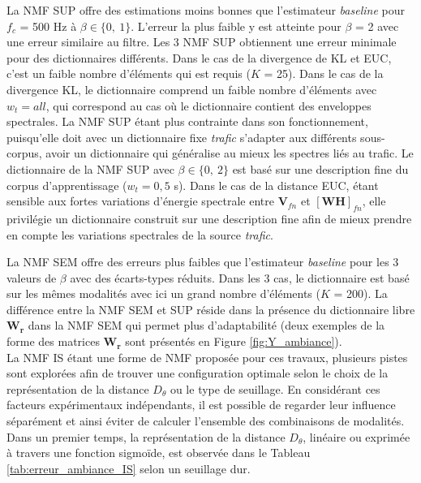La NMF SUP offre des estimations moins bonnes que l'estimateur \textit{baseline} pour $f_c$ = 500 Hz à  $\beta \in \lbrace 0,~1 \rbrace$. L'erreur la plus faible y est atteinte pour $\beta$ = 2 avec une erreur similaire au filtre.
Les 3 NMF SUP obtiennent une erreur minimale pour des dictionnaires différents. Dans le cas de la divergence de KL et EUC, c'est un faible nombre d'éléments qui est requis ($K$ = 25). Dans le cas de la divergence KL, le dictionnaire comprend un faible nombre d'éléments avec $w_t = all$, qui correspond au cas où le dictionnaire contient des enveloppes spectrales. La NMF SUP étant plus contrainte dans son fonctionnement, puisqu'elle doit avec un dictionnaire fixe \textit{trafic} s'adapter aux différents sous-corpus, avoir un dictionnaire qui généralise au mieux les spectres liés au trafic. Le dictionnaire de la NMF SUP avec $\beta \in \lbrace 0,~2 \rbrace$ est basé sur une description fine du corpus d'apprentissage ($w_t = 0,5$ s). Dans le cas de la distance EUC, étant sensible aux fortes variations d'énergie spectrale entre $\mathbf{V}_{fn}$ et $\left[\mathbf{WH}\right]_{fn}$, elle privilégie un dictionnaire construit sur une description fine afin de mieux prendre en compte les variations spectrales de la source \textit{trafic}.

La NMF SEM offre des erreurs plus faibles que l'estimateur \textit{baseline} pour les 3 valeurs de $\beta$ avec des écarts-types réduits. Dans les 3 cas, le dictionnaire est basé sur les mêmes modalités avec ici un grand nombre d'éléments ($K$ = 200).
La différence entre la NMF SEM et SUP réside dans la présence du dictionnaire libre $\mathbf{W_r}$ dans la NMF SEM qui permet plus d'adaptabilité (deux exemples de la forme des matrices $\mathbf{W_r}$ sont présentés en Figure \ref{fig:Y_ambiance}).\\

La NMF IS étant une forme de NMF proposée pour ces travaux, plusieurs pistes sont explorées afin de trouver une configuration optimale selon le choix de la représentation de la distance $D_{\theta}$ ou le type de seuillage. En considérant ces facteurs expérimentaux indépendants, il est possible de regarder leur influence séparément et ainsi éviter de calculer l'ensemble des combinaisons de modalités. Dans un premier temps, la représentation de la distance $D_{\theta}$, linéaire ou exprimée à travers une fonction sigmoïde, est observée dans le Tableau \ref{tab:erreur_ambiance_IS} selon un seuillage dur.

